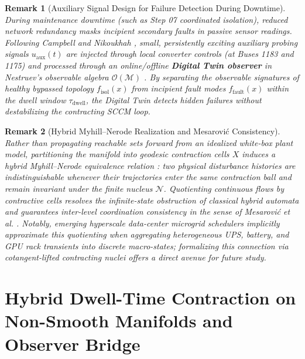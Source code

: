\documentclass[11pt]{article}
\newtheorem{remark}{Remark}
\begin{document}
\begin{remark}[Auxiliary Signal Design for Failure Detection During Downtime]
During maintenance downtime (such as Step 07 coordinated isolation), reduced network redundancy masks incipient secondary faults in passive sensor readings. Following Campbell and Nikoukhah \cite{CampbellNikoukhah2004}, small, persistently exciting auxiliary probing signals $u_{\mathrm{aux}}(t)$ are injected through local converter controls (at Buses 1183 and 1175) and processed through an online/offline \textbf{Digital Twin observer} in Nestruev's observable algebra $\mathcal{O}(\mathcal{M})$ \cite{Nestruev2003}. By separating the observable signatures of healthy bypassed topology $f_{\mathrm{isol}}(x)$ from incipient fault modes $f_{\mathrm{fault}}(x)$ within the dwell window $\tau_{\mathrm{dwell}}$, the Digital Twin detects hidden failures without destabilizing the contracting SCCM loop.
\end{remark}


\begin{remark}[Hybrid Myhill--Nerode Realization and Mesarovi\'c Consistency]
Rather than propagating reachable sets forward from an idealized white-box plant model, partitioning the manifold into geodesic contraction cells $X$ induces a \emph{hybrid Myhill--Nerode equivalence relation} \cite{Nerode1958}: two physical disturbance histories are indistinguishable whenever their trajectories enter the same contraction ball and remain invariant under the finite nucleus $\mathcal{N}$. Quotienting continuous flows by contractive cells resolves the infinite-state obstruction of classical hybrid automata and guarantees inter-level coordination consistency in the sense of Mesarovi\'c \textit{et al.} \cite{Mesarovic1970}. Notably, emerging hyperscale data-center microgrid schedulers implicitly approximate this quotienting when aggregating heterogeneous UPS, battery, and GPU rack transients into discrete macro-states; formalizing this connection via cotangent-lifted contracting nuclei offers a direct avenue for future study.
\end{remark}

\section{Hybrid Dwell-Time Contraction on Non-Smooth Manifolds and Observer Bridge}
\end{document}

